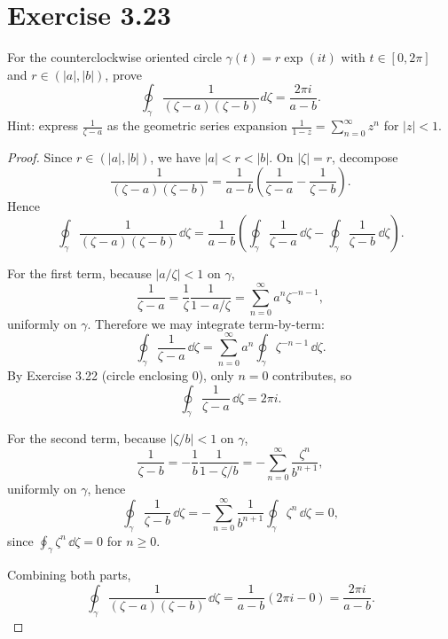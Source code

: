 \documentclass{article}
\begin{document}
\section{Exercise 3.23}

For the counterclockwise oriented circle $\gamma(t) = r\exp(it)$ with
$t \in [0, 2\pi]$ and $r \in (|a|, |b|)$, prove
\[
  \oint_\gamma \frac{1}{(\zeta - a)(\zeta - b)} d\zeta = \frac{2\pi i}{a - b}.
\]
Hint: express $\frac{1}{\zeta - a}$ as the geometric series expansion
$\frac{1}{1-z} = \sum_{n=0}^\infty z^n$ for $|z| < 1$.

\begin{proof}
  Since $r\in(|a|,|b|)$, we have $|a|<r<|b|$. On $|\zeta|=r$,
  decompose
  \[
    \frac{1}{(\zeta-a)(\zeta-b)}
    =\frac{1}{a-b}\left(\frac{1}{\zeta-a}-\frac{1}{\zeta-b}\right).
  \]
  Hence
  \[
    \oint_\gamma \frac{1}{(\zeta-a)(\zeta-b)}\,\dd\zeta
    =\frac{1}{a-b}\left(
      \oint_\gamma\frac{1}{\zeta-a}\,\dd\zeta
      -
      \oint_\gamma\frac{1}{\zeta-b}\,\dd\zeta
    \right).
  \]

  For the first term, because $|a/\zeta|<1$ on $\gamma$,
  \[
    \frac{1}{\zeta-a}
    =\frac{1}{\zeta}\frac{1}{1-a/\zeta}
    =\sum_{n=0}^{\infty}a^n\zeta^{-n-1},
  \]
  uniformly on $\gamma$. Therefore we may integrate term-by-term:
  \[
    \oint_\gamma\frac{1}{\zeta-a}\,\dd\zeta
    =\sum_{n=0}^{\infty}a^n\oint_\gamma\zeta^{-n-1}\,\dd\zeta.
  \]
  By Exercise 3.22 (circle enclosing $0$), only $n=0$ contributes, so
  \[
    \oint_\gamma\frac{1}{\zeta-a}\,\dd\zeta=2\pi i.
  \]

  For the second term, because $|\zeta/b|<1$ on $\gamma$,
  \[
    \frac{1}{\zeta-b}
    =-\frac{1}{b}\frac{1}{1-\zeta/b}
    =-\sum_{n=0}^{\infty}\frac{\zeta^n}{b^{n+1}},
  \]
  uniformly on $\gamma$, hence
  \[
    \oint_\gamma\frac{1}{\zeta-b}\,\dd\zeta
    =-\sum_{n=0}^{\infty}\frac{1}{b^{n+1}}\oint_\gamma\zeta^n\,\dd\zeta=0,
  \]
  since $\oint_\gamma\zeta^n\,\dd\zeta=0$ for $n\ge0$.

  Combining both parts,
  \[
    \oint_\gamma \frac{1}{(\zeta-a)(\zeta-b)}\,\dd\zeta
    =\frac{1}{a-b}(2\pi i-0)
    =\frac{2\pi i}{a-b}.
  \]
\end{proof}
\end{document}
